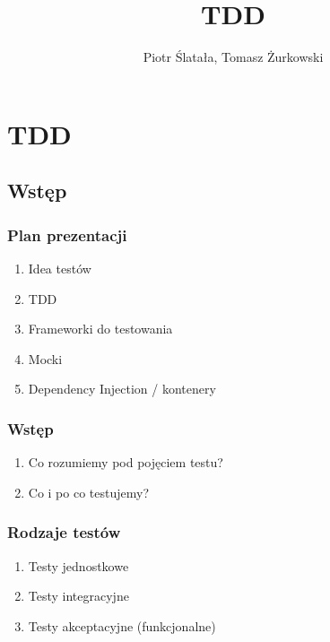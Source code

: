 \documentclass[slidestop,compress,mathserif]{beamer}
\title{TDD}
\author{Piotr Ślatała, Tomasz Żurkowski}
\begin{document}
\section{TDD}

\subsection{Wstęp}
\frame{
 \titlepage
}

\begin{frame}
 \frametitle{Plan prezentacji}
 \begin{enumerate}
 \item Idea testów
 \pause \item TDD
 \pause \item Frameworki do testowania
 \pause \item Mocki
 \pause \item Dependency Injection / kontenery
\end{enumerate}

\end{frame}


\begin{frame}
 \frametitle{Wstęp}
\begin{enumerate}
 \item Co rozumiemy pod pojęciem testu? %
 \pause \item Co i po co testujemy? %
\end{enumerate}
\end{frame}

\begin{frame}
\frametitle{Rodzaje testów}
 \begin{enumerate}
  \item Testy jednostkowe
  \pause \item Testy integracyjne
  \pause \item Testy akceptacyjne (funkcjonalne)
\end{enumerate}
\end{frame}
\end{document}
